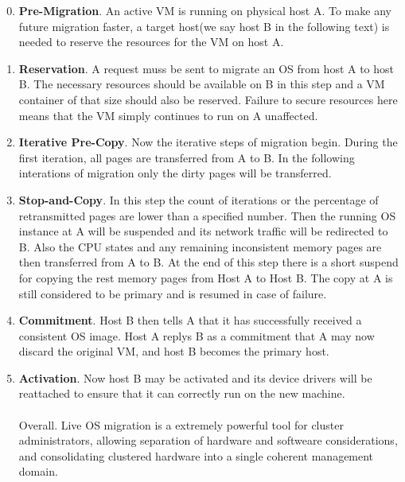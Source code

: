 \documentclass[runningheads]{llncs}
\begin{document}
\begin{enumerate}[label=\bfseries Stage \arabic*: ]
\setcounter{enumi}{-1}
\item
{\bfseries Pre-Migration}. An active VM is running on physical host A. To make any future	migration faster, a target host(we say host B in the following text) is needed to reserve the resources for the VM on host A.
\item
{\bfseries Reservation}. A request muss be sent to migrate an OS from host A to host B. The	necessary resources should be available on B in this step and a VM container of that size	should also be reserved. Failure to secure resources here means that the VM simply	continues to run on A	unaffected. 
\item
{\bfseries Iterative Pre-Copy}. Now the iterative steps of migration begin. During the first iteration,	all pages are transferred from A to B. In the following interations of migration only the dirty		pages will be transferred.
\item
{\bfseries Stop-and-Copy}. In this step the count of iterations or the percentage of retransmitted		pages are lower than a specified number. Then the running OS instance at A will be	suspended and  its network traffic will be redirected to B. Also the CPU states and any		remaining inconsistent memory pages are		then transferred from A to B. At the end of this	step there is a short suspend for copying the rest memory pages from Host A to Host B. The	copy at A is still considered to be primary and is resumed in case of failure. 
\item
{\bfseries Commitment}. Host B then tells A that it has successfully received a consistent OS	image. Host A replys B as a commitment that A may now discard the original VM, and host		B becomes the primary host.
\item
{\bfseries Activation}. Now host B may be activated and its device drivers will be reattached to	ensure that it can correctly run on the new machine.
\\\\
Overall. Live OS migration is a extremely powerful tool for cluster administrators, allowing separation of hardware and softweare considerations, and consolidating clustered hardware into a single coherent management domain.
\end{enumerate}
\end{document}
